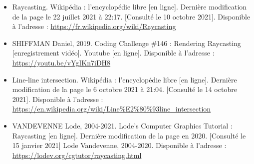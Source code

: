 \documentclass[11pt,french,a4paper,]{article}
\begin{document}
\begin{itemize}
\item
  Raycasting. Wikipédia : l'encyclopédie libre {[}en ligne{]}. Dernière
  modification de la page le 22 juillet 2021 à 22:17. {[}Consulté le 10
  octobre 2021{]}. Disponible à l'adresse :
  \url{https://fr.wikipedia.org/wiki/Raycasting}
\item
  SHIFFMAN Daniel, 2019. Coding Challenge \#146 : Rendering Raycasting
  {[}enregistrement vidéo{]}. Youtube {[}en ligne{]}. Disponible à
  l'adresse : \url{https://youtu.be/vYgIKn7iDH8}
\item
  Line-line intersection. Wikipédia : l'encyclopédie libre {[}en
  ligne{]}. Dernière modification de la page le 6 octobre 2021 à 21:04.
  {[}Consulté le 14 octobre 2021{]}. Disponible à l'adresse :
  \url{https://en.wikipedia.org/wiki/Line\%E2\%80\%93line_intersection}
\item
  VANDEVENNE Lode, 2004-2021. Lode's Computer Graphics Tutorial :
  Raycasting {[}en ligne{]}. Dernière modification de la page en 2020.
  {[}Consulté le 15 janvier 2021{]} Lode Vandevenne, 2004-2020.
  Disponible à l'adresse :
  \url{https://lodev.org/cgtutor/raycasting.html}
\end{itemize}
\end{document}
